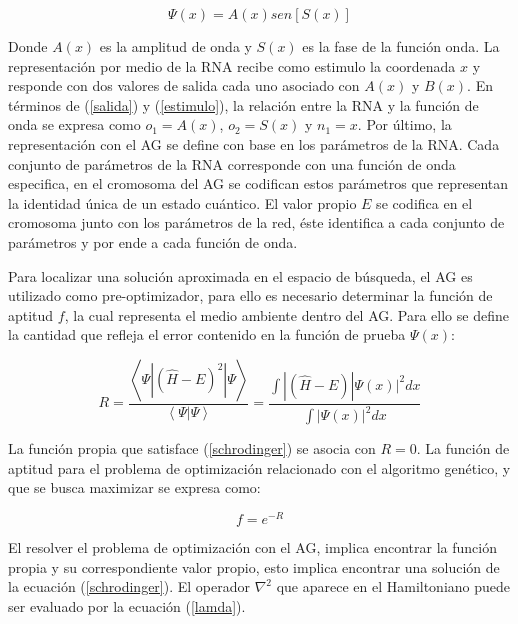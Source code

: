 \begin{equation}
	\Psi(x)=A(x)sen[S(x)]\label{fonda}
\end{equation}

Donde $A(x)$ es la amplitud de onda y $S(x)$ es la fase de la
funci\'on onda. La representaci\'on por medio de la RNA recibe
como estimulo la coordenada $x$ y responde con dos valores
de salida cada uno asociado con $A(x)$ y $B(x)$. En t\'erminos
de (\ref{salida}) y (\ref{estimulo}), la relaci\'on entre la RNA y la funci\'on de onda
se expresa como $o_1=A(x)$, $o_2=S(x)$ y $n_1=x$. Por
\'ultimo, la representaci\'on con el AG se define con base en
los par\'ametros de la RNA. Cada conjunto de par\'ametros de
la RNA corresponde con una funci\'on de onda especifica, en
el cromosoma del AG se codifican estos par\'ametros que representan
la identidad \'unica de un estado cu\'antico. El valor
propio $E$ se codifica en el cromosoma junto con los par\'ametros
de la red, \'este identifica a cada conjunto de par\'ametros y
por ende a cada funci\'on de onda.

Para localizar una soluci\'on aproximada en el espacio de b\'usqueda, el AG es utilizado como pre-optimizador, para ello es necesario determinar la funci\'on de aptitud $f$, la cual representa el medio ambiente dentro del AG. Para ello se define la cantidad que refleja el error contenido en la funci\'on de prueba $\Psi(x)$:
	
\begin{equation} R=\frac{\left\langle\Psi|(\hat{H}-E)^2|\Psi\right\rangle}{\left\langle\Psi|\Psi\right\rangle}=\frac{\int|(\hat{H}-E)|\Psi(x)|^2 dx}{\int|\Psi(x)|^2 dx} \label{error}\end{equation}    

La funci\'on propia que satisface (\ref{schrodinger}) se asocia con $R=0$. La funci\'on de aptitud para el problema de optimizaci\'on relacionado con el algoritmo gen\'etico, y que se busca maximizar se expresa como:

\begin{equation} f=e^{-R} \end{equation}

El resolver el problema de optimizaci\'on con el AG, implica encontrar la funci\'on propia y su correspondiente valor propio, esto implica encontrar una soluci\'on de la ecuaci\'on (\ref{schrodinger}). El operador $\nabla^2$ que aparece en el Hamiltoniano puede ser evaluado por la ecuaci\'on (\ref{lamda}). 
